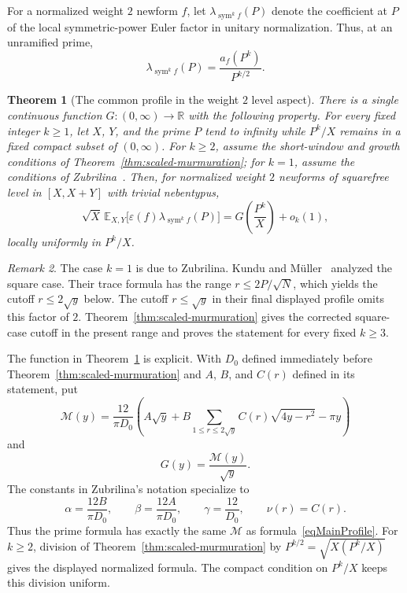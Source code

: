 \documentclass[12pt,reqno]{amsart}
\numberwithin{equation}{section}
\theoremstyle{plain}
\newtheorem{theorem}{Theorem}[section]
\theoremstyle{definition}
\theoremstyle{remark}
\newtheorem{remark}[theorem]{Remark}
\newcommand{\sym}{\operatorname{sym}}
\begin{document}
For a normalized weight $2$ newform $f$, let
$\lambda_{\sym^k f}(P)$ denote the coefficient at $P$ of the local symmetric-power Euler factor in unitary normalization.  Thus, at an unramified prime,
\begin{equation*}
\lambda_{\sym^k f}(P)=\frac{a_f(P^k)}{P^{k/2}}.
\end{equation*}

\begin{theorem}[The common profile in the weight $2$ level aspect]
\label{thmIntroProfile}
There is a single continuous function $G:(0,\infty)\to\mathbb R$ with the following property.
For every fixed integer $k\geq1$, let $X$, $Y$, and the prime $P$ tend to infinity while $P^k/X$ remains in a fixed compact subset of $(0,\infty)$.
For $k\geq2$, assume the short-window and growth conditions of Theorem~\ref{thm:scaled-murmuration}; for $k=1$, assume the conditions of Zubrilina~\cite[Theorem~1]{Zubrilina2025}.
Then, for normalized weight $2$ newforms of squarefree level in $[X,X+Y]$ with trivial nebentypus,
\begin{equation*}
\sqrt X\,
\mathbb E_{X,Y}
\bigl[\varepsilon(f)\lambda_{\sym^k f}(P)\bigr]
=
G\left(\frac{P^k}{X}\right)+o_k(1),
\end{equation*}
locally uniformly in $P^k/X$.
\end{theorem}

\begin{remark}
The case $k=1$ is due to Zubrilina.
Kundu and M\"uller~\cite{KunduMuller2026} analyzed the square case.  Their trace formula has the range $r\leq2P/\sqrt N$, which yields the cutoff $r\leq2\sqrt y$ below.  The cutoff $r\leq\sqrt y$ in their final displayed profile omits this factor of $2$.
Theorem~\ref{thm:scaled-murmuration} gives the corrected square-case cutoff in the present range and proves the statement for every fixed $k\geq3$.
\end{remark}

The function in Theorem~\ref{thmIntroProfile} is explicit.
With $D_0$ defined immediately before Theorem~\ref{thm:scaled-murmuration} and $A$, $B$, and $C(r)$ defined in its statement, put
\begin{equation}
\label{eqMainProfile}
\mathcal M(y)
=
\frac{12}{\pi D_0}
\left(
A\sqrt y+
B\sum_{1\leq r\leq2\sqrt y}
C(r)\sqrt{4y-r^2}
-\pi y
\right)
\end{equation}
and
\begin{equation*}
G(y)=\frac{\mathcal M(y)}{\sqrt y}.
\end{equation*}
The constants in Zubrilina's notation specialize to
\begin{equation*}
\alpha=\frac{12B}{\pi D_0},\qquad
\beta=\frac{12A}{\pi D_0},\qquad
\gamma=\frac{12}{D_0},\qquad
\nu(r)=C(r).
\end{equation*}
Thus the prime formula has exactly the same $\mathcal M$ as formula~\eqref{eqMainProfile}.
For $k\geq2$, division of Theorem~\ref{thm:scaled-murmuration} by $P^{k/2}=\sqrt{X(P^k/X)}$ gives the displayed normalized formula.
The compact condition on $P^k/X$ keeps this division uniform.
\end{document}
